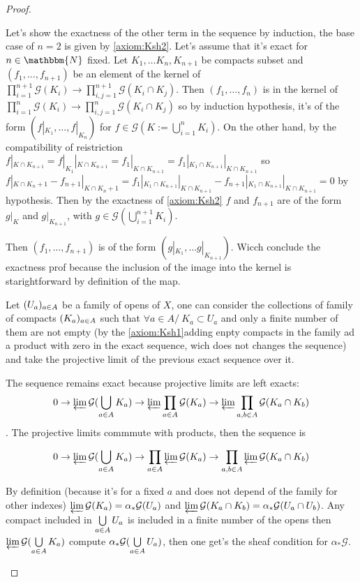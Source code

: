 \begin{proof}
\begin{itemize}
        Let's show the exactness of the other term in the sequence by induction, the base case of $n=2$ is given by \eqref{axiom:Ksh2}. Let's assume that it's exact for $n\in \mathbbm{N}$ fixed. Let $K_1,\ldots K_n, K_{n+1}$ be compacts subset and $(f_1,\ldots,f_{n+1})$ be an element of the kernel of  $\prod\limits_{i=1}^{n+1}\mathcal{G}(K_i)\to \prod\limits_{i,j=1}^{n+1}\mathcal{G}(K_i\cap K_j)$. Then $(f_1,\ldots,f_n)$ is in the kernel of $\prod\limits_{i=1}^n\mathcal{G}(K_i)\to \prod\limits_{i,j=1}^n\mathcal{G}(K_i\cap K_j)$ so by induction hypothesis, it's of the form $(f|_{K_1},\ldots,f|_{K_n})$ for $f\in \mathcal{G}(K:=\bigcup\limits_{i=1}^nK_i)$. 
        On the other hand, by the compatibility of reistriction $f|_{K\cap K_{n+1}}=f|_{K_1}|_{K\cap K_{n+1}}=f_1|_{K\cap K_{n+1}}=f_1|_{K_1\cap K_{n+1}}|_{K\cap K_{n+1}}$ so $f|_{K\cap K_n+1}-f_{n+1}|_{K\cap K_n+1}=f_1|_{K_1\cap K_{n+1}}|_{K\cap K_{n+1}}-f_{n+1}|_{K_1\cap K_{n+1}}|_{K\cap K_{n+1}}=0$ by hypothesis. Then by the exactness of \eqref{axiom:Ksh2} $f$ and $f_{n+1}$ are of the form $g|_K$ and $g|_{K_{n+1}}$, with $g\in \mathcal{G}(\bigcup\limits_{i=1}^{n+1} K_i)$.
        
        Then $(f_1,\ldots,f_{n+1})$ is of the form $(g|_{K_1},\ldots g|_{K_{n+1}})$. Wicch conclude the exactness prof because the inclusion of the image into the kernel is starightforward by definition of the map.

        Let $(U_a)_{a\in A}$ be a family of opens of $X$, one can consider the collections of family of compacts $(K_a)_{a\in A}$  such that $\forall a\in A /\ K_a\subset U_a$ and only  a finite number of them are not empty (by the \eqref{axiom:Ksh1}adding enpty compacts in the family ad a product with zero in the exact sequence, wich does not changes the sequence) and take the projective limit of the previous exact sequence over it.

        The sequence remains exact because projective limits are left exacts: $$0\to\varprojlim\mathcal{G}(\bigcup\limits_{a\in A}K_a)\to \varprojlim\prod\limits_{a\in A}\mathcal{G}(K_a)\to \varprojlim\prod\limits_{a,b\in A}\mathcal{G}(K_a\cap K_b)$$. The projective limits commmute with products, then the sequence is 

        $$0\to\varprojlim\mathcal{G}(\bigcup\limits_{a\in A}K_a)\to \prod\limits_{a\in A}\varprojlim\mathcal{G}(K_a)\to\prod\limits_{a,b\in A}\varprojlim\mathcal{G}(K_a\cap K_b)$$

        By definition (because it's for a fixed $a$ and does not depend of the family for other indexes) $\varprojlim\mathcal{G}(K_a)=\alpha_*\mathcal{G}(U_a)$ and $\varprojlim\mathcal{G}(K_a\cap K_b)=\alpha_*\mathcal{G}(U_a\cap U_b)$. Any compact included in $\bigcup\limits_{a\in A}U_a$ is included in a finite number of the opens then $\varprojlim\mathcal{G}(\bigcup\limits_{a\in A}K_a)$ compute $\alpha_*\mathcal{G}(\bigcup\limits_{a\in A}U_a)$, then one get's the sheaf condition for $\alpha_*\mathcal{G}$.


\end{itemize}
\end{proof}
